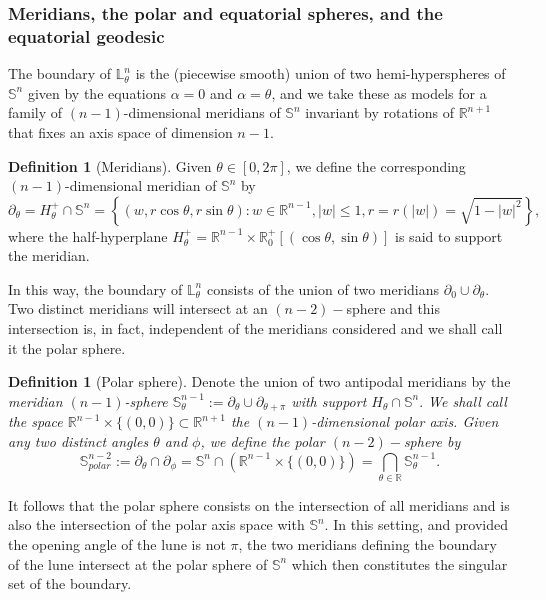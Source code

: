 \documentclass[11pt,a4paper,times]{amsart}
\theoremstyle{plain}
\theoremstyle{definition}
\newtheorem{definition}[thm]{Definition}%
\numberwithin{equation}{section}
\newcommand{\R}{\mathbb{R}}
\newcommand{\Se}{\mathbb{S}}
\newcommand{\lune}[2]{\mathbb{L}^{#1}_{#2}}
\newcommand{\txtg}{\textcolor{green}}
\begin{document}
\subsubsection{Meridians, the polar and equatorial spheres, and the equatorial geodesic}
  The boundary of $\lune{n}{\theta}$ is the (piecewise smooth) union of two hemi-hyperspheres of $\Se^n$ given by the equations
  $\alpha=0$ and $\alpha=\theta$,  and we take these as models for {a family of $(n-1)$-dimensional meridians
  of $\Se^n$ invariant by rotations of $\R^{n+1}$ that fixes an axis space of dimension $n-1$.}
\begin{definition}[Meridians]\label{(n-1)meridian}
Given $\theta\in {[0,2\pi]}$, we define the corresponding $(n-1)$-dimensional meridian of
$\Se^n$ by
\begin{equation}\label{partial}
\partial_{\theta}=  H_{\theta}^+\cap \Se^n
= \left\{ (w, r\cos\theta, r\sin\theta): w\in \R^{n-1}, |w|\leq 1,  r=r(|w|)=\sqrt{1-|w|^2}\right\}, 
 \end{equation} 
where the half-hyperplane $H^+_{\theta}=\R^{n-1} \times\R_0^+[(\cos\theta, \sin \theta)]$ is said to support the
meridian.
\end{definition}
In this way, the  boundary of $\lune{n}{\theta}$ consists of the union of two meridians $\partial_0\cup \partial_{\theta}$.
Two distinct meridians will intersect at an $(n-2)-$sphere and this intersection is, in fact, independent of the meridians
considered and we shall call it the polar sphere.
\begin{definition}[Polar sphere] Denote the union of two antipodal meridians by the \em meridian  $(n-1)$-sphere \em
$\Se^{n-1}_{\theta}:=\partial_{\theta}\cup\partial_{\theta+\pi}$ with support $H_{\theta}\cap \Se^n.$
%
We shall call the \em  space $\R^{n-1}\times \{(0,0)\}\subset \R^{n+1}$ the  $(n-1)$-dimensional \em polar axis.
 Given any two distinct angles $\theta$ and $\phi$, we define the polar $(n-2)-$sphere by
\begin{equation}\label{POLE}
\Se^{n-2}_{polar}:=
\partial_{\theta}\cap \partial_{\phi}
=\Se^{n}\cap (\R^{n-1}\times
 \{(0,0)\})= \bigcap_{\theta\in \R} \Se^{n-1}_{\theta}.
 \end{equation}
\end{definition}
It follows that the polar sphere consists on the intersection of all meridians and is also the intersection of
the polar axis space with $\Se^n$. In this setting, and provided the opening angle of the lune is not $\pi$, the
two meridians defining the boundary of the lune intersect at the polar sphere of $\Se^{n}$ which then constitutes
the singular set of the boundary.
\end{document}
